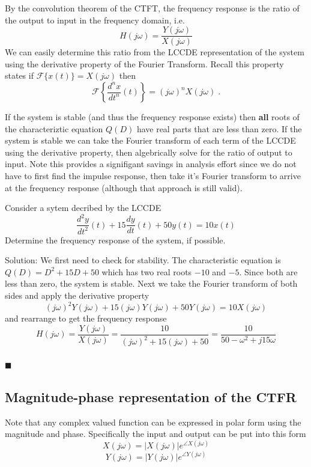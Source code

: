 By the convolution theorem of the CTFT, the frequency response is the ratio of the output to input in the frequency domain, i.e.
\[
H(j\omega) = \frac{Y(j\omega)}{X(j\omega)}
\]
We can easily determine this ratio from the LCCDE representation of the system using the derivative property of the Fourier Transform. Recall this property states if $\mathcal{F}\{x(t)\} = X(j\omega)$ then
\[
\mathcal{F}\left\{\frac{d^n x}{dt^n}(t) \right\} = (j\omega)^n  X(j\omega) \; .
\]

If the system is stable (and thus the frequency response exists) then \textbf{all} roots of the characteriztic equation $Q(D)$ have real parts that are less than zero. If the system is stable we can take the Fourier transform of each term of the LCCDE using the derivative property, then algebrically solve for the ratio of output to input. Note this provides a signifigant savings in analysis effort since we do not have to first find the impulse response, then take it's Fourier transform to arrive at the frequency response (although that approach is still valid).

\begin{example} Consider a sytem decribed by the LCCDE
  \[
\frac{d^2y}{dt^2}(t) + 15\frac{dy}{dt}(t) + 50y(t) = 10x(t) 
  \]
  Determine the frequency response of the system, if possible.

  Solution: We first need to check for stability. The characteristic equation is $Q(D) = D^2 + 15D + 50$ which has two real roots $-10$ and $-5$. Since both are less than zero, the system is stable. Next we take the Fourier transform of both sides and apply the derivative property
  \[
  (j\omega)^2Y(j\omega) + 15(j\omega) Y(j\omega) + 50Y(j\omega) = 10X(j\omega)
  \]
  and rearrange to get the frequency response
  \[
  H(j\omega) = \frac{Y(j\omega)}{X(j\omega)} = \frac{10}{(j\omega)^2 + 15(j\omega) + 50} = \frac{10}{50-\omega^2 + j15\omega}
  \]\\
  $\blacksquare$
\end{example}

\subsection{Magnitude-phase representation of the CTFR}

Note that any complex valued function can be expressed in polar form using the magnitude and phase. Specifically the input and output can be put into this form
\[
X(j\omega) = |X(j\omega)|e^{\angle X(j\omega)}
\]
\[
Y(j\omega) = |Y(j\omega)|e^{\angle Y(j\omega)}
\]

